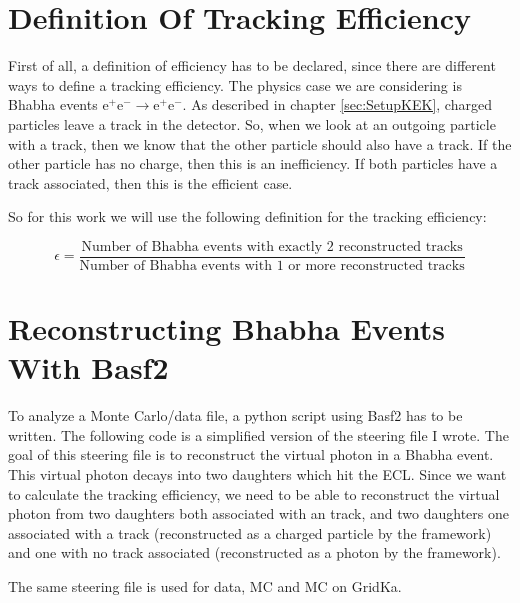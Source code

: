 \documentclass[a4paper,11pt,twosided,final,german,openbib,pdftex,listof=totoc,bibliography=totoc]{scrbook}
\begin{document}
\section{Definition Of Tracking Efficiency}
\label{sec:Eff}

First of all, a definition of efficiency has to be declared, since there are different ways to define a tracking efficiency. The physics case we are considering is Bhabha events $ \textrm{e}^+ \textrm{e}^- \rightarrow \textrm{e}^+ \textrm{e}^- $. As described in chapter \ref{sec:SetupKEK}, charged particles leave a track in the detector. So, when we look at an outgoing particle with a track, then we know that the other particle should also have a track. If the other particle has no charge, then this is an inefficiency. If both particles have a track associated, then this is the efficient case.

So for this work we will use the following definition for the tracking efficiency:

\begin{equation}
	\epsilon = \frac{\textrm{Number of Bhabha events with exactly 2 reconstructed tracks}}{\textrm{Number of Bhabha events with 1 or more reconstructed tracks}}
	\label{eq:efficiency}
\end{equation}

\section{Reconstructing Bhabha Events With Basf2}
\label{sec:RecBasf2}


To analyze a Monte Carlo/data file, a python script using Basf2 has to be written. The following code is a simplified version of the steering file I wrote. The goal of this steering file is to reconstruct the virtual photon in a Bhabha event. This virtual photon decays into two daughters which hit the ECL. Since we want to calculate the tracking efficiency, we need to be able to reconstruct the virtual photon from two daughters both associated with an track, and two daughters one associated with a track (reconstructed as a charged particle by the framework) and one with no track associated (reconstructed as a photon by the framework).

The same steering file is used for data, MC and MC on GridKa.
\newline 
\end{document}
